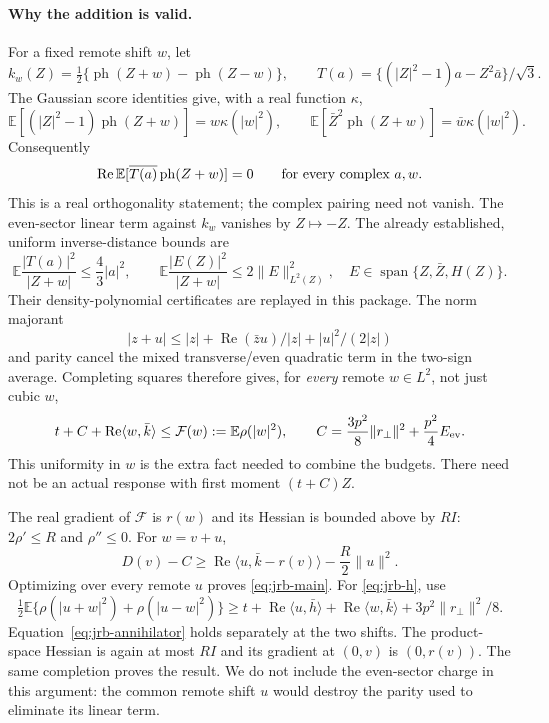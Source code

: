 \paragraph{Why the addition is valid.}
For a fixed remote shift $w$, let
\[
 k_w(Z)=\tfrac12\{\operatorname{ph}(Z+w)-\operatorname{ph}(Z-w)\},
 \qquad T(a)=\{(|Z|^2-1)a-Z^2\bar a\}/\sqrt3.
\]
The Gaussian score identities give, with a real function $\kappa$,
\[
 \mathbb E[(|Z|^2-1)\operatorname{ph}(Z+w)]=w\kappa(|w|^2),\qquad
 \mathbb E[\bar Z^2\operatorname{ph}(Z+w)]=\bar w\kappa(|w|^2).
\]
Consequently
\begin{equation}\label{eq:jrb-annihilator}
 \operatorname{Re}\mathbb E[\overline{T(a)}\operatorname{ph}(Z+w)]=0
 \qquad\hbox{for every complex }a,w.
\end{equation}
This is a real orthogonality statement; the complex pairing need not vanish.
The even-sector linear term against $k_w$ vanishes by $Z\mapsto-Z$.
The already established, uniform inverse-distance bounds are
\[
 \mathbb E\frac{|T(a)|^2}{|Z+w|}\le\frac43|a|^2,\qquad
 \mathbb E\frac{|E(Z)|^2}{|Z+w|}\le2\|E\|_{L^2(Z)}^2,
 \quad E\in\operatorname{span}\{Z,\bar Z,H(Z)\}.
\]
Their density-polynomial certificates are replayed in this package.
The norm majorant
\[
 |z+u|\le |z|+\operatorname{Re}(\bar zu)/|z|+|u|^2/(2|z|)
\]
and parity cancel the mixed transverse/even quadratic term in the
two-sign average. Completing squares therefore gives, for \emph{every}
remote $w\in L^2$, not just cubic $w$,
\begin{equation}\label{eq:jrb-shift-stable}
 t+C+\operatorname{Re}\langle w,\bar k\rangle
 \le\mathcal F(w):=\mathbb E\rho(|w|^2),\qquad
 C=\frac{3p^2}{8}\|r_\perp\|^2+\frac{p^2}{4}E_{\rm ev}.
\end{equation}
This uniformity in $w$ is the extra fact needed to combine the budgets.
There need not be an actual response with first moment $(t+C)Z$.

The real gradient of $\mathcal F$ is $r(w)$ and its Hessian is bounded
above by $R I$: $2\rho'\le R$ and $\rho''\le0$. For $w=v+u$,
\[
 D(v)-C\ge \operatorname{Re}\langle u,\bar k-r(v)\rangle
                      -\frac R2\|u\|^2.
\]
Optimizing over every remote $u$ proves \eqref{eq:jrb-main}.
For \eqref{eq:jrb-h}, use
\[
 \tfrac12\mathbb E\{\rho(|u+w|^2)+\rho(|u-w|^2)\}
 \ge t+\operatorname{Re}\langle u,\bar h\rangle
       +\operatorname{Re}\langle w,\bar k\rangle
       +3p^2\|r_\perp\|^2/8.
\]
Equation~\eqref{eq:jrb-annihilator} holds separately at the two shifts.
The product-space Hessian is again at most $R I$ and its gradient at
$(0,v)$ is $(0,r(v))$. The same completion proves the result. We do not
include the even-sector charge in this argument: the common remote shift
$u$ would destroy the parity used to eliminate its linear term.


